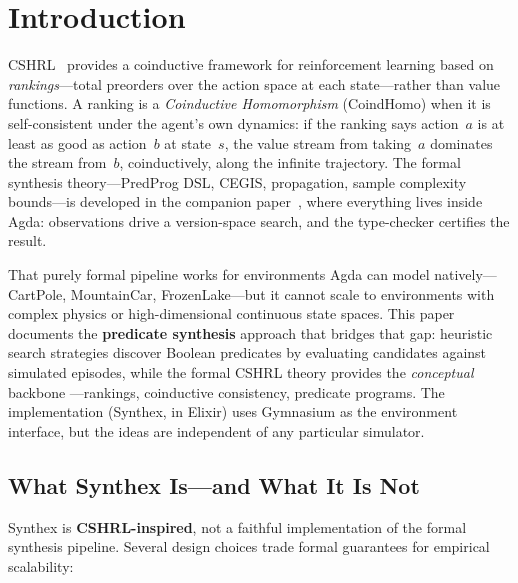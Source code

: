 \documentclass[9pt,a4paper]{article}
\theoremstyle{plain}
\theoremstyle{definition}
\theoremstyle{remark}
\begin{document}
\section{Introduction}

CSHRL~\cite{CSHRL2026} provides a coinductive framework for
reinforcement learning based on \emph{rankings}---total preorders
over the action space at each state---rather than value functions.
A ranking is a \emph{Coinductive Homomorphism} (CoindHomo) when it
is self-consistent under the agent's own dynamics: if the ranking
says action~$a$ is at least as good as action~$b$ at state~$s$,
the value stream from taking~$a$ dominates the stream from~$b$,
coinductively, along the infinite trajectory.  The formal synthesis
theory---PredProg DSL, CEGIS, propagation, sample complexity
bounds---is developed in the companion
paper~\cite{CSHRLSynthesis2026}, where everything lives inside
Agda: observations drive a version-space search, and the
type-checker certifies the result.

That purely formal pipeline works for environments Agda can model
natively---CartPole, MountainCar, FrozenLake---but it cannot
scale to environments with complex physics or high-dimensional
continuous state spaces.  This paper documents the
\textbf{predicate synthesis} approach that bridges that gap:
heuristic search strategies discover Boolean predicates by
evaluating candidates against simulated episodes, while
the formal CSHRL theory provides the \emph{conceptual} backbone
---rankings, coinductive consistency, predicate programs.
The implementation (Synthex, in Elixir) uses Gymnasium as the
environment interface, but the ideas are independent of any
particular simulator.

\subsection{What Synthex Is---and What It Is Not}

Synthex is \textbf{CSHRL-inspired}, not a faithful implementation
of the formal synthesis pipeline.  Several design choices trade
formal guarantees for empirical scalability:
\end{document}
